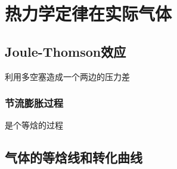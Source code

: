 \documentclass[11pt]{article}
\begin{document}
\section{热力学定律在实际气体}
\label{sec:org1f72d53}
\subsection{Joule-Thomson效应}
\label{sec:org55ee7bc}
利用多空塞造成一个两边的压力差
\subsubsection{节流膨胀过程}
\label{sec:org4219194}
是个等焓的过程
\subsection{气体的等焓线和转化曲线}
\label{sec:orga542a93}
\end{document}
